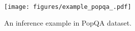 \begin{figure}[!b]
\centering
\texttt{[image: figures/example\_popqa\_.pdf]}
\caption{An inference example in PopQA dataset.}
\label{fig:example_popqa}
\end{figure}